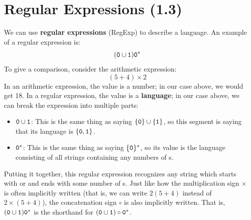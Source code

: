 \documentclass[letterpaper]{article}
\begin{document}
\newpage 
\section{Regular Expressions (1.3)}
We can use \textbf{regular expressions} (RegExp) to describe a language. An example of a regular expression is: 
\[(\texttt{0} \cup \texttt{1}) \texttt{0}^*\]
To give a comparison, consider the arithmetic expression:
\[(5 + 4) \times 2\]
In an arithmetic expression, the value is a number; in our case above, we would get 18. In a regular expression, the value is a \textbf{language}; in our case above, we can break the expression into multiple parts: 
\begin{itemize}
    \item $\texttt{0} \cup \texttt{1}$: This is the same thing as saying $\{\texttt{0}\} \cup \{\texttt{1}\}$, so this segment is saying that its language is $\{\texttt{0}, \texttt{1}\}$.
    \item $\texttt{0}^*$: This is the same thing as saying $\{\texttt{0}\}^*$, so its value is the language consisting of all strings containing any numbers of s.
\end{itemize}
Putting it together, this regular expression recognizes any string which starts with  or  and ends with some number of s. Just like how the multiplication sign $\times$ is often implicitly written (that is, we can write $2(5 + 4)$ instead of $2 \times (5 + 4)$), the concatenation sign $\circ$ is also implicitly written. That is, $(\texttt{0} \cup \texttt{1}) \texttt{0}^*$ is the shorthand for $(\texttt{0} \cup \texttt{1}) \circ \texttt{0}^*$. 
\end{document}
